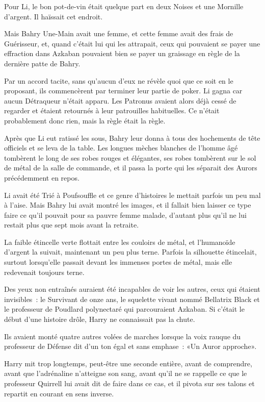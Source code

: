 Pour Li, le bon pot-de-vin était quelque part en deux Noises et une Mornille d'argent. Il haïssait cet endroit.

Mais Bahry Une-Main avait une femme, et cette femme avait des frais de Guérisseur, et, quand c'était lui qui les attrapait, ceux qui pouvaient se payer une effraction dans Azkaban pouvaient bien se payer un graissage en règle de la dernière patte de Bahry.

Par un accord tacite, sans qu'aucun d'eux ne révèle quoi que ce soit en le proposant, ils commencèrent par terminer leur partie de poker. Li gagna car aucun Détraqueur n'était apparu. Les Patronus avaient alors déjà cessé de regarder et étaient retournés à leur patrouilles habituelles. Ce n'était probablement donc rien, mais la règle était la règle.

Après que Li eut ratissé les sous, Bahry leur donna à tous des hochements de tête officiels et se leva de la table. Les longues mèches blanches de l'homme âgé tombèrent le long de ses robes rouges et élégantes, ses robes tombèrent sur le sol de métal de la salle de commande, et il passa la porte qui les séparait des Aurors précédemment en repos.

Li avait été Trié à Poufsouffle et ce genre d'histoires le mettait parfois un peu mal à l'aise. Mais Bahry lui avait montré les images, et il fallait bien laisser ce type faire ce qu'il pouvait pour sa pauvre femme malade, d'autant plus qu'il ne lui restait plus que sept mois avant la retraite.

\later

La faible étincelle verte flottait entre les couloirs de métal, et l'humanoïde d'argent la suivait, maintenant un peu plus terne. Parfois la silhouette étincelait, surtout lorsqu'elle passait devant les immenses portes de métal, mais elle redevenait toujours terne.

Des yeux non entraînés auraient été incapables de voir les autres, ceux qui étaient invisibles~: le Survivant de onze ans, le squelette vivant nommé Bellatrix Black et le professeur de Poudlard polynectaré qui parcouraient Azkaban. Si c'était le début d'une histoire drôle, Harry ne connaissait pas la chute.

Ils avaient monté quatre autres volées de marches lorsque la voix rauque du professeur de Défense dit d'un ton égal et sans emphase~: «Un Auror approche».

Harry mit trop longtemps, peut-être une seconde entière, avant de comprendre, avant que l'adrénaline n'atteigne son sang, avant qu'il ne se rappelle ce que le professeur Quirrell lui avait dit de faire dans ce cas, et il pivota sur ses talons et repartit en courant en sens inverse.

